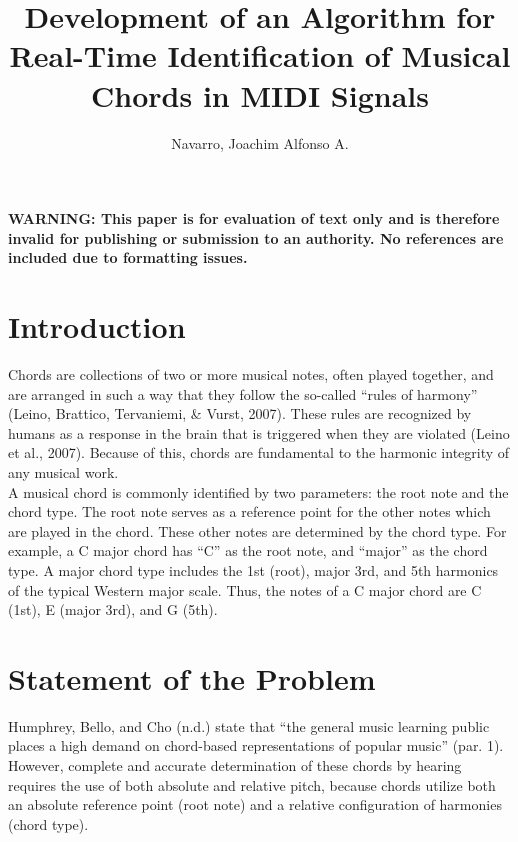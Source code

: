 \documentclass{article}
\begin{document}
	\title{Development of an Algorithm for Real-Time Identification of Musical Chords in MIDI Signals}
	
	\author{Navarro, Joachim Alfonso A.}
	
	\maketitle
	
	\begin{center}
		\textbf{WARNING: This paper is for evaluation of text only and is therefore invalid for publishing or submission to an authority. No references are included due to formatting issues.}
	\end{center}
	
	\section{Introduction}
	Chords are collections of two or more musical notes, often played together, and are arranged in such a way that they follow the so-called “rules of harmony” (Leino, Brattico, Tervaniemi, \& Vurst, 2007). These rules are recognized by humans as a response in the brain that is triggered when they are violated (Leino et al., 2007). Because of this, chords are fundamental to the harmonic integrity of any musical work.\\
	
	A musical chord is commonly identified by two parameters: the root note and the chord type. The root note serves as a reference point for the other notes which are played in the chord. These other notes are determined by the chord type. For example, a C major chord has “C” as the root note, and “major” as the chord type. A major chord type includes the 1st (root), major 3rd, and 5th harmonics of the typical Western major scale. Thus, the notes of a C major chord are C (1st), E (major 3rd), and G (5th). \\
	
	\section{Statement of the Problem}
	Humphrey, Bello, and Cho (n.d.) state that “the general music learning public places a high demand on chord-based representations of popular music” (par. 1). However, complete and accurate determination of these chords by hearing requires the use of both absolute and relative pitch, because chords utilize both an absolute reference point (root note) and a relative configuration of harmonies (chord type).\\
	
\end{document}
